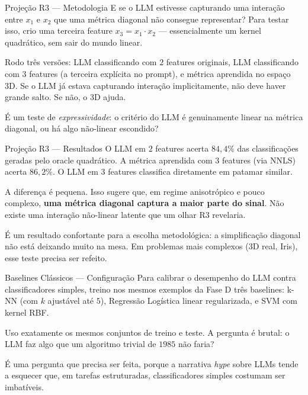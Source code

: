 \documentclass[aspectratio=169,10pt]{beamer}
\begin{document}
\begin{frame}{Proje\c{c}\~ao R3 --- Metodologia}
  \small
  E se o LLM estivesse capturando uma intera\c{c}\~ao entre $x_1$ e $x_2$ que uma m\'etrica diagonal
  n\~ao consegue representar? Para testar isso, crio uma terceira feature $x_3 = x_1 \cdot x_2$ ---
  essencialmente um kernel quadr\'atico, sem sair do mundo linear.
  \medskip

  Rodo tr\^es vers\~oes: LLM classificando com $2$ features originais, LLM classificando com $3$ features
  (a terceira expl\'icita no prompt), e m\'etrica aprendida no espa\c{c}o 3D. Se o LLM j\'a estava
  capturando intera\c{c}\~ao implicitamente, n\~ao deve haver grande salto. Se n\~ao, o 3D ajuda.
  \medskip

  \'E um teste de \emph{expressividade}: o crit\'erio do LLM \'e genuinamente linear na m\'etrica
  diagonal, ou h\'a algo n\~ao-linear escondido?
\end{frame}

\begin{frame}{Proje\c{c}\~ao R3 --- Resultados}
  \small
  O LLM em $2$ features acerta $84{,}4\%$ das classifica\c{c}\~oes geradas pelo oracle quadr\'atico.
  A m\'etrica aprendida com $3$ features (via NNLS) acerta $86{,}2\%$. O LLM em $3$ features classifica
  diretamente em patamar similar.
  \medskip

  A diferen\c{c}a \'e pequena. Isso sugere que, em regime anisotr\'opico e pouco complexo, \textbf{uma
  m\'etrica diagonal captura a maior parte do sinal}. N\~ao existe uma intera\c{c}\~ao n\~ao-linear
  latente que um olhar R3 revelaria.
  \medskip

  \'E um resultado confortante para a escolha metodol\'ogica: a simplifica\c{c}\~ao diagonal n\~ao est\'a
  deixando muito na mesa. Em problemas mais complexos (3D real, Iris), esse teste precisa ser refeito.
\end{frame}

\begin{frame}{Baselines Cl\'assicos --- Configura\c{c}\~ao}
  \small
  Para calibrar o desempenho do LLM contra classificadores simples, treino nos mesmos exemplos da Fase D
  tr\^es baselines: k-NN (com $k$ ajust\'avel at\'e $5$), Regress\~ao Log\'istica linear regularizada,
  e SVM com kernel RBF.
  \medskip

  Uso exatamente os mesmos conjuntos de treino e teste. A pergunta \'e brutal: o LLM faz algo que um
  algoritmo trivial de $1985$ n\~ao faria?
  \medskip

  \'E uma pergunta que precisa ser feita, porque a narrativa \emph{hype} sobre LLMs tende a esquecer
  que, em tarefas estruturadas, classificadores simples costumam ser imbat\'iveis.
\end{frame}
\end{document}
